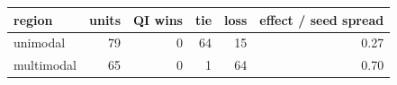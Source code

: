 \begin{tabular}{lrrrrr}
\toprule
region & units & QI wins & tie & loss & effect / seed spread \\
\midrule
unimodal & 79 & 0 & 64 & 15 & 0.27 \\
multimodal & 65 & 0 & 1 & 64 & 0.70 \\
\bottomrule
\end{tabular}